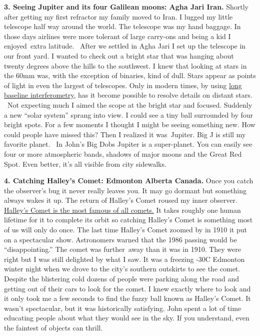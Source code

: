 \textbf{3. Seeing Jupiter and its four Galilean moons: Agha Jari
Iran.} Shortly after getting my first refractor my family moved to Iran.
I lugged my little telescope half way around the world. The telescope
was my hand baggage. In those days airlines were more tolerant of large
carry-ons and being a kid I enjoyed~extra latitude. ~After we settled in
Agha Jari I set up the telescope in our front yard. I wanted to check
out a bright star that was hanging about twenty degrees above the hills
to the southwest. I knew that looking at stars in the 60mm was, with the
exception of binaries, kind of dull. Stars appear as points of light in
even the largest of telescopes. Only in modern times, by using
\href{http://isi.ssl.berkeley.edu/}{long baseline interferometry}, has
it become possible to resolve details on distant stars. ~Not expecting
much I aimed the scope at the bright star and focused. Suddenly a new
``solar system'' sprang into view. I could see a tiny ball surrounded by
four bright spots. For a few moments I thought I might be seeing
something new. How could people have missed this? Then I realized it
was~Jupiter. Big J is still my favorite planet.~ In John's Big Dobs
Jupiter is a super-planet. You can easily see four or more atmospheric
bands, shadows of major moons and the Great Red Spot. Even better, it's
all visible from city sidewalks.

\medskip

\textbf{4. Catching Halley's Comet: Edmonton Alberta Canada.} Once you
catch the observer's bug it never really leaves you. It may go dormant
but something always wakes it up. The return of Halley's Comet roused my
inner observer.
\href{https://en.wikipedia.org/wiki/Halley\%27s\_Comet}{Halley's Comet
is the most famous of all comets.} It takes roughly one human lifetime
for it to complete its orbit so catching Halley's Comet is something
most of us will only do once. The last time Halley's Comet zoomed by in
1910 it put on a spectacular show. Astronomers warned that the 1986
passing would be ``disappointing.'' The comet was further~away than it
was in 1910. They were right but I was still delighted by what I saw. It
was a freezing -30C Edmonton winter night when we drove to the city's
southern outskirts to see the comet. Despite the blistering cold dozens
of people were parking along the road and getting out of their cars to
look for the comet. I knew exactly where to look and it only took me a
few seconds to find the fuzzy ball known as Halley's Comet. It wasn't
spectacular, but it was historically satisfying. John spent a lot of
time educating people about what they would see in the sky. If you
understand, even the faintest of objects can thrill.

